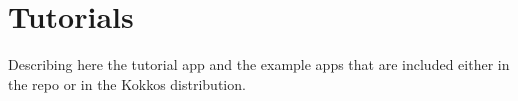 \section{Tutorials}\label{chap:tutorial}

Describing here the tutorial app and the example apps that are included either in the repo or in the Kokkos distribution. 